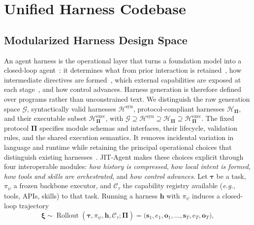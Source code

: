 \documentclass{article}
\newcommand{\ourmethod}{JIT-Agent\xspace}
\begin{document}
\section{Unified Harness Codebase}
\vspace{-0.5em}
\label{sec:harness_codebase}

\vspace{-0.5em}
\subsection{Modularized Harness Design Space}
\vspace{-0.5em}
An agent harness is the operational layer that turns a foundation model into a closed-loop agent~\citep{202604.0428,zhou2026externalizationllmagentsunified}: it determines what from prior interaction is retained~\citep{hu2026memoryageaiagents}, how intermediate directives are formed~\citep{cao2025largelanguagemodelsplanning}, which external capabilities are exposed at each stage~\citep{xu2026agentskillslargelanguage,yang2026efficientagentsmemorytool}, and how control advances. Harness generation is therefore defined over programs rather than unconstrained text. We distinguish the raw generation space $\mathcal{G}$, syntactically valid harnesses $\mathcal{H}^{\mathrm{syn}}$, protocol-compliant harnesses $\mathcal{H}_{\boldsymbol{\Pi}}$, and their executable subset $\mathcal{H}^{\mathrm{exec}}_{\boldsymbol{\Pi}}$, with $\mathcal{G}\supseteq\mathcal{H}^{\mathrm{syn}}\supseteq\mathcal{H}_{\boldsymbol{\Pi}}\supseteq\mathcal{H}^{\mathrm{exec}}_{\boldsymbol{\Pi}}$. The fixed protocol $\boldsymbol{\Pi}$ specifies module schemas and interfaces, their lifecycle, validation rules, and the shared execution semantics. It removes incidental variation in language and runtime while retaining the principal operational choices that distinguish existing harnesses~\citep{autogen,githubGitHubAg2aiag2,githubGitHubLangchainailanggraph,luo2025largelanguagemodelagent}.
\ourmethod makes these choices explicit through four interoperable modules: \textit{how history is compressed}, \textit{how local intent is formed}, \textit{how tools and skills are orchestrated}, and \textit{how control advances}. Let $\boldsymbol{\tau}$ be a task, $\pi_{\psi}$ a frozen backbone executor, and $\mathcal{C}_{\tau}$ the capability registry available (\textit{e.g.}, tools, APIs, skills) to that task. Running a harness $\mathbf{h}$ with $\pi_{\psi}$ induces a closed-loop trajectory
\begin{equation}
\label{eq:trajectory}
    \boldsymbol{\xi}
    \sim \operatorname{Rollout}(\boldsymbol{\tau},\pi_{\psi},\mathbf{h},\mathcal{C}_{\tau};\boldsymbol{\Pi})
    = \bigl(\mathbf{s}_1,e_1,\mathbf{o}_1,\ldots,\mathbf{s}_T,e_T,\mathbf{o}_T\bigr),
\end{equation}
\end{document}
